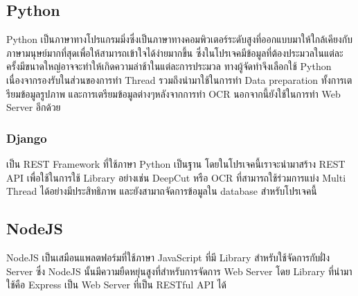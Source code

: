 \subsection{Python}

Python เป็นภาษาทางโปรแกรมมิ่งซึ่งเป็นภาษาทางคอมพิวเตอร์ระดับสูงที่ออกแบบมาให้ใกล้เคียงกับภาษามนุษย์มากที่สุดเพื่อให้สามารถเข้าใจได้ง่ายมากขึ้น ซึ่งในโปรเจคมีข้อมูลที่ต้องประมวลในแต่ละครั้งมีขนาดใหญ่อาจจะทำให้เกิดความล่าช้าในแต่ละการประมวล ทางผู้จัดทำจึงเลือกใช้ Python เนื่องจากรองรับในส่วนของการทำ Thread รวมถึงนำมาใช้ในการทำ Data preparation ทั้งการเตรียมข้อมูลรูปภาพ และการเตรียมข้อมูลต่างๆหลังจากการทำ OCR นอกจากนี้ยังใช้ในการทำ Web Server อีกด้วย 

\subsubsection{Django}

เป็น REST Framework ที่ใช้ภาษา Python เป็นฐาน โดยในโปรเจคนี้เราจะนำมาสร้าง REST API  เพื่อใช้ในการใช้ Library อย่างเช่น DeepCut หรือ OCR ที่สามารถใช้ร่วมการแบ่ง Multi Thread ได้อย่างมีประสิทธิภาพ และยังสามาถจัดการข้อมูลใน database สำหรับโปรเจคนี้

\subsection{NodeJS}

NodeJS เป็นเสมือนแพลตฟอร์มที่ใช้ภาษา JavaScript ที่มี Library สำหรับใช้จัดการกับฝั่ง Server ซึ่ง NodeJS นั้นมีความยืดหยุ่นสูงที่สำหรับการจัดการ Web Server โดย Library ที่นำมาใช้คือ Express เป็น Web Server ที่เป็น RESTful API ได้